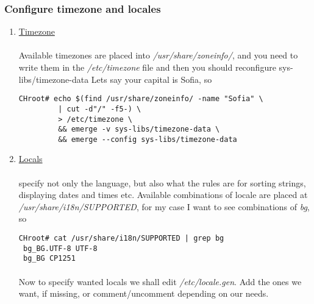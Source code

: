 \documentclass[10pt,a4paper]{article}
\begin{document}
            \newpage
            \subsubsection{Configure timezone and locales}

                \begin{enumerate}
                    \item  \href{https://wiki.gentoo.org/wiki/Handbook:AMD64/Installation/Base#Timezone}{Timezone}

                        \paragraph{} Available timezones are placed into \textit{/usr/share/zoneinfo/}, and you need to write them in the \textit{/etc/timezone} file and then you should reconfigure  sys-libs/timezone-data Lets say your capital is Sofia, so

\begin{lstlisting}[style=BashInputCHRoot]
 CHroot# echo $(find /usr/share/zoneinfo/ -name "Sofia" \
         | cut -d"/" -f5-) \
         > /etc/timezone \
         && emerge -v sys-libs/timezone-data \
         && emerge --config sys-libs/timezone-data
\end{lstlisting}

                    \newpage
                    \item   \href{https://wiki.gentoo.org/wiki/Handbook:AMD64/Installation/Base#Configure_locales}{Locals}

                    \paragraph{} specify not only the language, but also what the rules are for sorting strings, displaying dates and times etc. Available combinations of locale are placed at \textit{/usr/share/i18n/SUPPORTED}, for my case I want to see combinations of \textit{bg}, so

\begin{lstlisting}[style=BashInputCHRoot]
 CHroot# cat /usr/share/i18n/SUPPORTED | grep bg
 bg_BG.UTF-8 UTF-8
 bg_BG CP1251
\end{lstlisting}

                    \paragraph{} Now to specify wanted locals we shall edit \textit{/etc/locale.gen}. Add the ones we want, if missing, or comment/uncomment depending on our needs.


\end{enumerate}
\end{document}
